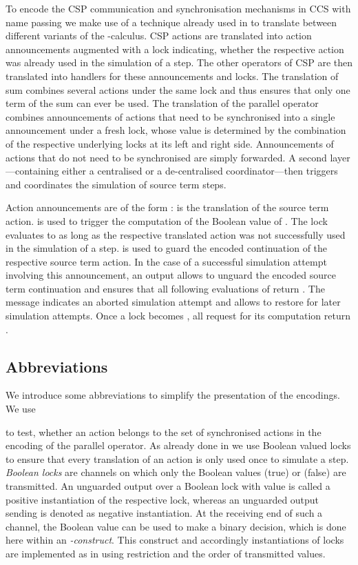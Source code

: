 \documentclass[]{eptcs}
\begin{document}
To encode the CSP communication and synchronisation mechanisms in CCS with name passing we make use of a technique already used in \cite{petersNestmann12, peters12} to translate between different variants of the -calculus. CSP actions are translated into action announcements augmented with a lock indicating, whether the respective action was already used in the simulation of a step. The other operators of CSP are then translated into handlers for these announcements and locks.
The translation of sum combines several actions under the same lock and thus ensures that only one term of the sum can ever be used.
The translation of the parallel operator combines announcements of actions that need to be synchronised into a single announcement under a fresh lock, whose value is determined by the combination of the respective underlying locks at its left and right side. Announcements of actions that do not need to be synchronised are simply forwarded.
A second layer---containing either a centralised or a de-centralised coordinator---then triggers and coordinates the simulation of source term steps.

Action announcements are of the form :  is the translation of the source term action.  is used to trigger the computation of the Boolean value of . The lock  evaluates to  as long as the respective translated action was not successfully used in the simulation of a step.  is used to guard the encoded continuation of the respective source term action. In the case of a successful simulation attempt involving this announcement, an output  allows to unguard the encoded source term continuation and ensures that all following evaluations of  return . The message  indicates an aborted simulation attempt and allows to restore  for later simulation attempts. Once a lock becomes , all request for its computation return .

\subsection{Abbreviations}

We introduce some abbreviations to simplify the presentation of the encodings. We use

to test, whether an action belongs to the set of synchronised actions in the encoding of the parallel operator.
As already done in \cite{nestmann96, nestmannPierce00} we use Boolean valued locks to ensure that every translation of an action is only used once to simulate a step.
\emph{Boolean locks} are channels on which only the Boolean values  (true) or  (false) are transmitted. An unguarded output over a Boolean lock with value  is called a positive instantiation of the respective lock, whereas an unguarded output sending  is denoted as negative instantiation. At the receiving end of such a channel, the Boolean value can be used to make a binary decision, which is done here within an \emph{-construct}.
This construct and accordingly instantiations of locks are implemented as in \cite{nestmann96, nestmannPierce00} using restriction and the order of transmitted values.
\end{document}
